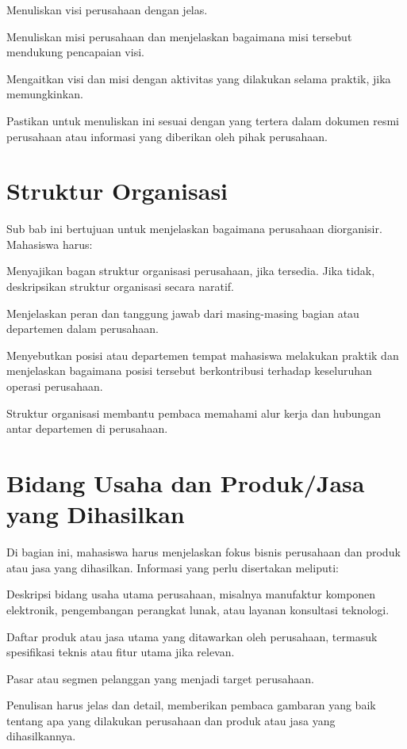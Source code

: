 \begin{packed_enum}
    \item Menuliskan visi perusahaan dengan jelas.
    \item Menuliskan misi perusahaan dan menjelaskan bagaimana misi tersebut mendukung pencapaian visi.
    \item Mengaitkan visi dan misi dengan aktivitas yang dilakukan selama praktik, jika memungkinkan.
\end{packed_enum}
Pastikan untuk menuliskan ini sesuai dengan yang tertera dalam dokumen resmi perusahaan atau informasi yang diberikan oleh pihak perusahaan.

\section{Struktur Organisasi}
Sub bab ini bertujuan untuk menjelaskan bagaimana perusahaan diorganisir. Mahasiswa harus:

\begin{packed_enum}
    \item Menyajikan bagan struktur organisasi perusahaan, jika tersedia. Jika tidak, deskripsikan struktur organisasi secara naratif.
    \item Menjelaskan peran dan tanggung jawab dari masing-masing bagian atau departemen dalam perusahaan.
    \item Menyebutkan posisi atau departemen tempat mahasiswa melakukan praktik dan menjelaskan bagaimana posisi tersebut berkontribusi terhadap keseluruhan operasi perusahaan.
\end{packed_enum}

Struktur organisasi membantu pembaca memahami alur kerja dan hubungan antar departemen di perusahaan.

\section{Bidang Usaha dan Produk/Jasa yang Dihasilkan}
Di bagian ini, mahasiswa harus menjelaskan fokus bisnis perusahaan dan produk atau jasa yang dihasilkan. Informasi yang perlu disertakan meliputi:

\begin{packed_enum}
    \item Deskripsi bidang usaha utama perusahaan, misalnya manufaktur komponen elektronik, pengembangan perangkat lunak, atau layanan konsultasi teknologi.
    \item Daftar produk atau jasa utama yang ditawarkan oleh perusahaan, termasuk spesifikasi teknis atau fitur utama jika relevan.
    \item Pasar atau segmen pelanggan yang menjadi target perusahaan.
\end{packed_enum}

Penulisan harus jelas dan detail, memberikan pembaca gambaran yang baik tentang apa yang dilakukan perusahaan dan produk atau jasa yang dihasilkannya.